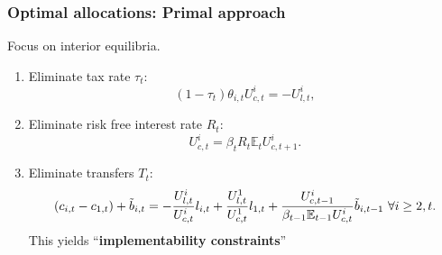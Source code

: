 \documentclass{beamer}
\begin{document}
\begin{frame}
 \frametitle{Optimal allocations: Primal approach}
Focus on  interior equilibria.
 \begin{enumerate}
  \item Eliminate tax rate $\tau_t$:
\small
\begin{equation*}
\left( 1-\tau _{t}\right) \theta _{i,t}U_{c,t}^{i}=-U_{l,t}^{i},
\end{equation*}%
\normalsize
\item Eliminate risk free interest rate $R_t$:
\small
\begin{equation*}
U_{c,t}^{i}=\beta_tR_{t}\mathbb{E}_{t}U_{c,t+1}^{i}.  \label{FOC Euler}
\end{equation*}%
\normalsize
\item Eliminate transfers $T_t$:
{\small
\begin{equation*}
\left( c_{i,t}-c_{1,t}\right) +\tilde{b}_{i,t} =-\frac{U_{l,t}^{i}}{U_{c,t}^{i}}l_{i,t}+\frac{U^1_{l,t}}{U^1_{c,t}}l_{1,t} +\frac{U_{c,t-1}^{i}}{\beta_{t-1} \mathbb{E}%
_{t-1}U_{c,t}^{i}}\tilde{b}_{i,t-1}\ \forall i\geq2,t.  \notag
\end{equation*} }
This yields ``\textbf{implementability constraints}''%
 \end{enumerate}
\end{frame}
\end{document}
